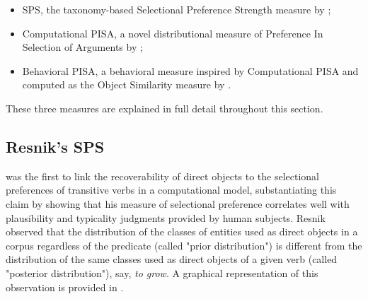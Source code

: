 \begin{itemize}
    \item SPS, the taxonomy-based Selectional Preference Strength measure by \textcite{Resnik1993, Resnik1996};
    \item Computational PISA, a novel distributional measure of Preference In Selection of Arguments by \textcite{CappelliLenciPISA};
    \item Behavioral PISA, a behavioral measure inspired by Computational PISA and computed as the Object Similarity measure by \textcite{Medina2007}.
\end{itemize}

These three measures are explained in full detail throughout this section.


\subsection{Resnik's SPS}

\textcite{Resnik1993, Resnik1996} was the first to link the recoverability of direct objects to the selectional preferences of transitive verbs in a computational model, substantiating this claim by showing that his measure of selectional preference correlates well with plausibility and typicality judgments provided by human subjects. Resnik observed that the distribution of the classes of entities used as direct objects in a corpus regardless of the predicate (called "prior distribution") is different from the distribution of the same classes used as direct objects of a given verb (called "posterior distribution"), say, \textit{to grow}. A graphical representation of this observation is provided in .

